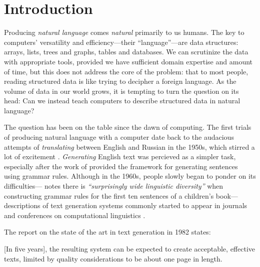 \chapter{Introduction}
\label{chap:intro}
Producing \emph{natural language} comes \emph{natural} primarily to us humans.
The key to computers' versatility and efficiency---their ``language''---are data structures: arrays, lists, trees and graphs, tables and databases.
We can scrutinize the data with appropriate tools, provided we have sufficient domain expertise and amount of time, but this does not address the core of the problem: that to most people, reading structured data is like trying to decipher a foreign language. As the volume of data in our world grows, it is tempting to turn the question on its head: Can we instead teach computers to describe structured data in natural language?


The question has been on the table since the dawn of computing. The first trials of producing natural language with a computer date back to the audacious attempts of \emph{translating} between English and Russian in the 1950s, which stirred a lot of excitement \cite{sheridan1955research}. \emph{Generating} English text was percieved as a simpler task, especially after the work of \citet{chomsky1957syntactic} provided the framework for generating sentences using grammar rules. Although in the 1960s, people slowly began to ponder on its difficulties---\citet{yngve1961random} notes there is \emph{``surprisingly wide linguistic diversity''} when constructing grammar rules for the first ten sentences of a children's book---descriptions of text generation systems commonly started to appear in journals and conferences on computational linguistics \cite{woolley-1969-automatic,meehan-1975-using,mcdonald-1975-framework,wang-1980-computational}.

The report on the state of the art in text generation in 1982 states:

\begin{pquotation}{\citealp{mann-1982-text}}
    [In five years], the resulting system can be expected to create acceptable, effective texts, limited by quality considerations to be about one page in length.
\end{pquotation}

